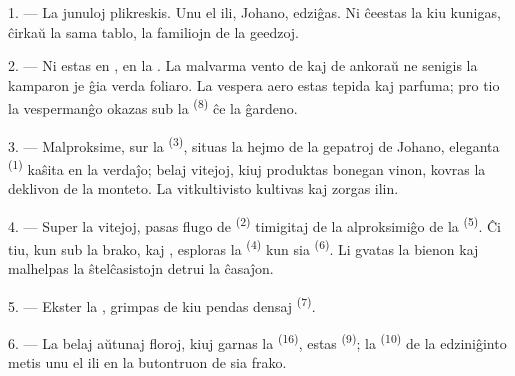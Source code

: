 
\VUsaut{4.0mm}
\VUsaut{1.6mm}
\VUsaut{3.2mm}

\VUsaut{1.6mm}
\VUsaut{2.6mm}

\VUsaut{3.0mm}

1. --- La junuloj plikreskis. Unu el ili, Johano, edziĝas. Ni ĉeestas la
 kiu kunigas, ĉirkaŭ la sama tablo, la familiojn de
la geedzoj.

2. --- Ni estas en , en la . La
malvarma vento de  kaj de  ankoraŭ ne
senigis la kamparon je ĝia verda foliaro. La vespera aero estas tepida kaj
parfuma; pro tio la vespermanĝo okazas sub la 
\textsuperscript{(8)} ĉe la ĝardeno.

3. --- Malproksime, sur la  \textsuperscript{(3)}, situas la
hejmo de la gepatroj de Johano, eleganta  \textsuperscript{(1)}
kaŝita en la verdaĵo; belaj vitejoj, kiuj produktas bonegan vinon, kovras la
deklivon de la monteto. La vitkultivisto kultivas kaj zorgas ilin.

4. --- Super la vitejoj, pasas flugo de 
\textsuperscript{(2)} timigitaj de la alproksimiĝo de la 
\textsuperscript{(5)}. Ĉi tiu, kun  sub la brako, kaj
, esploras la 
\textsuperscript{(4)} kun sia  \textsuperscript{(6)}. Li
gvatas la bienon kaj malhelpas la ŝtelĉasistojn detrui la ĉasaĵon.

5. --- Ekster la , grimpas  de kiu pendas
densaj  \textsuperscript{(7)}.

6. --- La belaj aŭtunaj floroj, kiuj garnas la 
\textsuperscript{(16)}, estas  \textsuperscript{(9)}; la
 \textsuperscript{(10)} de la edziniĝinto metis unu el ili en la
butontruon de sia frako.


